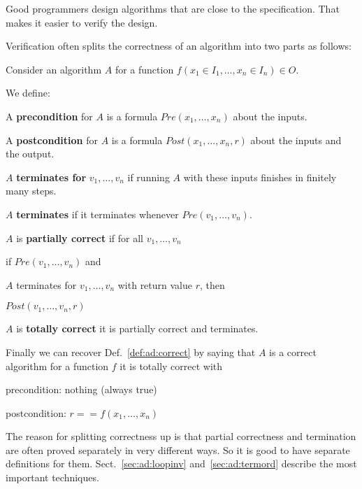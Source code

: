 Good programmers design algorithms that are close to the specification.
That makes it easier to verify the design.

Verification often splits the correctness of an algorithm into two parts as follows:

\begin{definition}\label{def:ad:correct2}
Consider an algorithm $A$ for a function $f(x_1\in I_1,\ldots,x_n\in I_n)\in O$.

We define:
\begin{compactitem}
\item A \textbf{precondition} for $A$ is a formula $Pre(x_1,\ldots,x_n)$ about the inputs.
\item A \textbf{postcondition} for $A$ is a formula $Post(x_1,\ldots,x_n,r)$ about the inputs and the output.
\item $A$ \textbf{terminates for} $v_1,\ldots,v_n$ if running $A$ with these inputs finishes in finitely many steps.
\item $A$ \textbf{terminates} if it terminates whenever $Pre(v_1,\ldots,v_n)$.
\item $A$ is \textbf{partially correct} if for all $v_1,\ldots,v_n$
\begin{compactitem}
 \item if $Pre(v_1,\ldots,v_n)$ and
 \item $A$ terminates for $v_1,\ldots,v_n$ with return value $r$, then
 \item $Post(v_1,\ldots,v_n,r)$
\end{compactitem}
\item $A$ is \textbf{totally correct} it is partially correct and terminates.
\end{compactitem}

Finally we can recover Def.~\ref{def:ad:correct} by saying that $A$ is a correct algorithm for a function $f$ it is totally correct with 
\begin{compactitem}
 \item precondition: nothing (always true)
 \item postcondition: $r==f(x_1,\ldots,x_n)$
\end{compactitem}
\end{definition}

The reason for splitting correctness up is that partial correctness and termination are often proved separately in very different ways.
 So it is good to have separate definitions for them.
 Sect.~\ref{sec:ad:loopinv} and~\ref{sec:ad:termord} describe the most important techniques.

